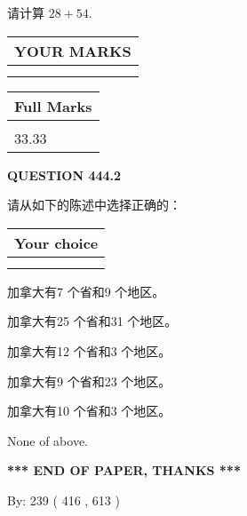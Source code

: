 \documentclass{ctexart}
\begin{document}
  
 
请计算 $ %
28 +  %
54 $.
 

 

 
  
\vspace{0.2in}
  
\noindent\begin{tabular}{|l|}
\hline
 YOUR MARKS  \\
\hline
 \\ 
 \\ 
\hline
\end{tabular}
\hspace{0.05in} \begin{tabular}{|l|}
\hline
 Full Marks  \\
\hline
 \\ 
33.33 \\
\hline
\end{tabular}
{\textbf{\Large{QUESTION
444.2 
}}}
  
  
请从如下的陈述中选择正确的：
  
  
\noindent\hspace{3.0in} \begin{tabular}{|l|}
\hline
Your choice \\
\hline
 \\ 
 \\ 
\hline
\end{tabular}
  
  
 
 
加拿大有7 个省和9 个地区。
 
 
加拿大有25 个省和31 个地区。
 
 
加拿大有12 个省和3 个地区。
 
 
加拿大有9 个省和23 个地区。
 
 
加拿大有10 个省和3 个地区。
 
 
 None of above.
 
 
   
   
 \vspace{0.2in}
 
   
   
   
   
\vspace{1.0in} 
{\textbf{\large{ *** END OF PAPER, THANKS *** }}} 
   
   
\hspace{1.0in} By: 
 239 ( 416 ,  613 )
   
\end{document}
